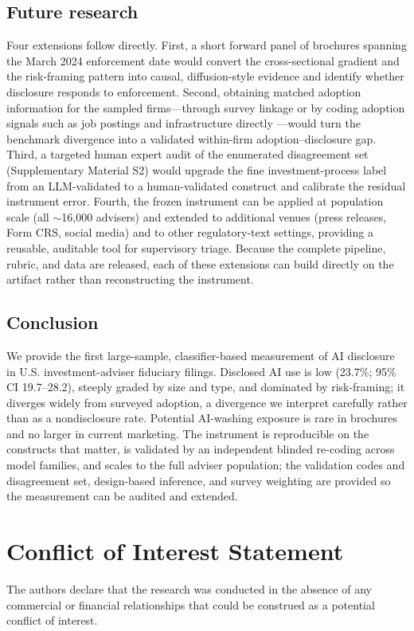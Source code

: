 \documentclass[utf8]{FrontiersinHarvard}
\begin{document}
\subsection{Future research}
Four extensions follow directly. First, a short forward panel of brochures spanning the March 2024 enforcement date would convert the cross-sectional gradient and the risk-framing pattern into causal, diffusion-style evidence and identify whether disclosure responds to enforcement. Second, obtaining matched adoption information for the sampled firms---through survey linkage or by coding adoption signals such as job postings and infrastructure directly \citep{babina2024}---would turn the benchmark divergence into a validated within-firm adoption--disclosure gap. Third, a targeted human expert audit of the enumerated disagreement set (Supplementary Material S2) would upgrade the fine investment-process label from an LLM-validated to a human-validated construct and calibrate the residual instrument error. Fourth, the frozen instrument can be applied at population scale (all $\sim$16{,}000 advisers) and extended to additional venues (press releases, Form CRS, social media) and to other regulatory-text settings, providing a reusable, auditable tool for supervisory triage. Because the complete pipeline, rubric, and data are released, each of these extensions can build directly on the artifact rather than reconstructing the instrument.

\subsection{Conclusion}
We provide the first large-sample, classifier-based measurement of AI disclosure in U.S. investment-adviser fiduciary filings. Disclosed AI use is low (23.7\%; 95\% CI 19.7--28.2), steeply graded by size and type, and dominated by risk-framing; it diverges widely from surveyed adoption, a divergence we interpret carefully rather than as a nondisclosure rate. Potential AI-washing exposure is rare in brochures and no larger in current marketing. The instrument is reproducible on the constructs that matter, is validated by an independent blinded re-coding across model families, and scales to the full adviser population; the validation codes and disagreement set, design-based inference, and survey weighting are provided so the measurement can be audited and extended.

\section*{Conflict of Interest Statement}
The authors declare that the research was conducted in the absence of any commercial or financial relationships that could be construed as a potential conflict of interest.
\end{document}
